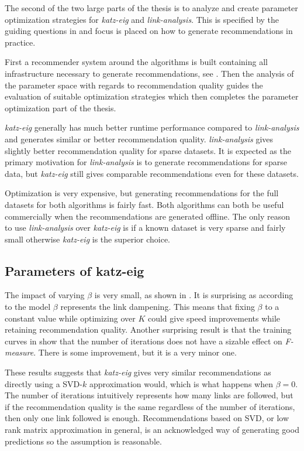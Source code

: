 The second of the two large parts of the thesis is to analyze and create parameter optimization strategies for \textit{katz-eig} and \textit{link-analysis}. This is specified by the guiding questions in  and focus is placed on how to generate recommendations in practice.

First a recommender system around the algorithms is built containing all infrastructure necessary to generate recommendations, see . Then the analysis of the parameter space with regards to recommendation quality guides the evaluation of suitable optimization strategies which then completes the parameter optimization part of the thesis.

\textit{katz-eig} generally has much better runtime performance compared to \textit{link-analysis} and generates similar or better recommendation quality. \textit{link-analysis} gives slightly better recommendation quality for sparse datasets. It is expected as the primary motivation for \textit{link-analysis} is to generate recommendations for sparse data, but \textit{katz-eig} still gives comparable recommendations even for these datasets.

Optimization is very expensive, but generating recommendations for the full datasets for both algorithms is fairly fast. Both algorithms can both be useful commercially when the recommendations are generated offline. The only reason to use \textit{link-analysis} over \textit{katz-eig} is if a known dataset is very sparse and fairly small otherwise \textit{katz-eig} is the superior choice.

\subsection{Parameters of katz-eig}

The impact of varying $\beta$ is very small, as shown in . It is surprising as according to the model $\beta$ represents the link dampening.  This means that fixing $\beta$ to a constant value while optimizing over $K$ could give speed improvements while retaining recommendation quality. Another surprising result is that the training curves in  show that the number of iterations does not have a sizable effect on \textit{F-measure}. There is some improvement, but it is a very minor one.

These results suggests that \textit{katz-eig} gives very similar recommendations as directly using a SVD-$k$ approximation would, which is what happens when $\beta = 0$. The number of iterations intuitively represents how many links are followed, but if the recommendation quality is the same regardless of the number of iterations, then only one link followed is enough. Recommendations based on SVD, or low rank matrix approximation in general, is an acknowledged way of generating good predictions \citep{bobadilla2013recommender, lu2012recommender} so the assumption is reasonable.

